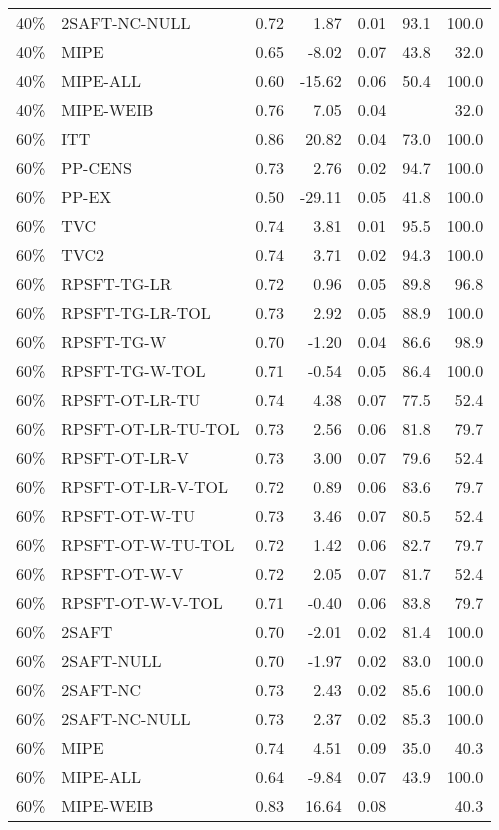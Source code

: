\begin{table}[ht]
{\begin{tabular}{llrrrrr}
  40\% & 2SAFT-NC-NULL & 0.72 & 1.87 & 0.01 & 93.1 & 100.0 \\ 
  40\% & MIPE & 0.65 & -8.02 & 0.07 & 43.8 & 32.0 \\ 
  40\% & MIPE-ALL & 0.60 & -15.62 & 0.06 & 50.4 & 100.0 \\ 
  40\% & MIPE-WEIB & 0.76 & 7.05 & 0.04 &  & 32.0 \\ 
   \hline
60\% & ITT & 0.86 & 20.82 & 0.04 & 73.0 & 100.0 \\ 
  60\% & PP-CENS & 0.73 & 2.76 & 0.02 & 94.7 & 100.0 \\ 
  60\% & PP-EX & 0.50 & -29.11 & 0.05 & 41.8 & 100.0 \\ 
  60\% & TVC & 0.74 & 3.81 & 0.01 & 95.5 & 100.0 \\ 
  60\% & TVC2 & 0.74 & 3.71 & 0.02 & 94.3 & 100.0 \\ 
   \hline
60\% & RPSFT-TG-LR & 0.72 & 0.96 & 0.05 & 89.8 & 96.8 \\ 
  60\% & RPSFT-TG-LR-TOL & 0.73 & 2.92 & 0.05 & 88.9 & 100.0 \\ 
  60\% & RPSFT-TG-W & 0.70 & -1.20 & 0.04 & 86.6 & 98.9 \\ 
  60\% & RPSFT-TG-W-TOL & 0.71 & -0.54 & 0.05 & 86.4 & 100.0 \\ 
  60\% & RPSFT-OT-LR-TU & 0.74 & 4.38 & 0.07 & 77.5 & 52.4 \\ 
  60\% & RPSFT-OT-LR-TU-TOL & 0.73 & 2.56 & 0.06 & 81.8 & 79.7 \\ 
  60\% & RPSFT-OT-LR-V & 0.73 & 3.00 & 0.07 & 79.6 & 52.4 \\ 
  60\% & RPSFT-OT-LR-V-TOL & 0.72 & 0.89 & 0.06 & 83.6 & 79.7 \\ 
   \hline
60\% & RPSFT-OT-W-TU & 0.73 & 3.46 & 0.07 & 80.5 & 52.4 \\ 
  60\% & RPSFT-OT-W-TU-TOL & 0.72 & 1.42 & 0.06 & 82.7 & 79.7 \\ 
  60\% & RPSFT-OT-W-V & 0.72 & 2.05 & 0.07 & 81.7 & 52.4 \\ 
  60\% & RPSFT-OT-W-V-TOL & 0.71 & -0.40 & 0.06 & 83.8 & 79.7 \\ 
   \hline
60\% & 2SAFT & 0.70 & -2.01 & 0.02 & 81.4 & 100.0 \\ 
  60\% & 2SAFT-NULL & 0.70 & -1.97 & 0.02 & 83.0 & 100.0 \\ 
  60\% & 2SAFT-NC & 0.73 & 2.43 & 0.02 & 85.6 & 100.0 \\ 
  60\% & 2SAFT-NC-NULL & 0.73 & 2.37 & 0.02 & 85.3 & 100.0 \\ 
  60\% & MIPE & 0.74 & 4.51 & 0.09 & 35.0 & 40.3 \\ 
  60\% & MIPE-ALL & 0.64 & -9.84 & 0.07 & 43.9 & 100.0 \\ 
  60\% & MIPE-WEIB & 0.83 & 16.64 & 0.08 &  & 40.3 \\ 
   \hline
\end{tabular}
}
\end{table}
